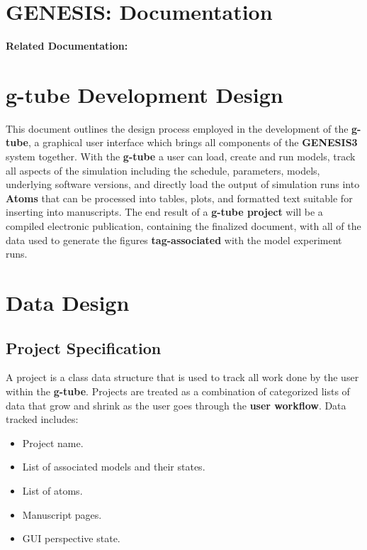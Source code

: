 \documentclass[12pt]{article}
\begin{document}
\section*{GENESIS: Documentation}

{\bf Related Documentation:}

\section*{g-tube Development Design}

	This document outlines the design process employed in the development of the {\bf g-tube}, a graphical user interface which brings all components of the {\bf GENESIS3} system together. With the {\bf g-tube} a user can load, create and run models, track all aspects of the simulation including the schedule, parameters, models, underlying software versions, and directly load the output of simulation runs into {\bf Atoms} that can be processed into tables, plots, and formatted text suitable for inserting into manuscripts. The end result of a {\bf g-tube project} will be a compiled electronic publication, containing the finalized document, with all of the data used to generate the figures {\bf tag-associated}  with the model experiment runs. 


\section*{Data Design}

\subsection*{Project Specification}

	A project is a class data structure that is used to track all work done by the user within the {\bf g-tube}. Projects are treated as a combination of categorized lists of data that grow and shrink as the user goes through the {\bf user workflow}. Data tracked includes:
	
\begin{itemize}
	\item[] Project name.
	\item[] List of associated models and their states.
	\item[] List of atoms.
	\item[] Manuscript pages.
	\item[] GUI perspective state.
\end{itemize}
\end{document}
